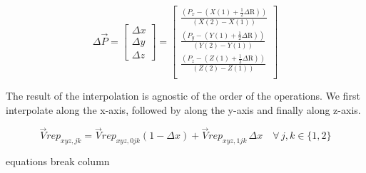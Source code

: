 \documentclass[letterpaper, 10 pt, conference]{ieeeconf}  %
\begin{document}
\begin{equation}
	\label{eq: deltas interp}
	\Delta \vec{P} =
	\begin{bmatrix}
		\Delta x \\
		\Delta y \\
		\Delta z		
	\end{bmatrix}
	=
	\begin{bmatrix}
		\frac{\left( P_x - \left( X(1) + \frac{1}{2} \Delta \mathrm{R} \right)  \right)}{\left( X(2) - X(1) \right)} \\
		\frac{\left( P_y - \left( Y(1) + \frac{1}{2} \Delta \mathrm{R} \right)  \right)}{\left( Y(2) - Y(1) \right)} \\
		\frac{\left( P_z - \left( Z(1) + \frac{1}{2} \Delta \mathrm{R} \right)  \right)}{\left( Z(2) - Z(1) \right)} \\
	\end{bmatrix}
\end{equation}

The result of the interpolation is agnostic of the order of the operations. We first interpolate along the x-axis, followed by along the y-axis and finally along z-axis.

	
\begin{equation}
	\label{eq: interp x}
	\vec{V}rep_{xyz,jk} = \vec{V}rep_{xyz,0jk}(1 - \Delta x) + \vec{V}rep_{xyz,1jk} \, \Delta x \quad \forall \, j, k \in \{1, 2\}
\end{equation}

\alert{equations break column}

%
\end{document}
